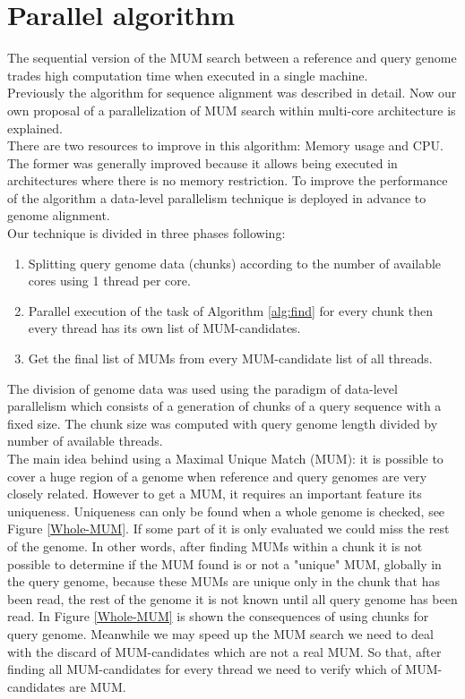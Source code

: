 \documentclass[3p,times]{elsarticle}
\begin{document}
\section{Parallel algorithm}  
The sequential version of the MUM search between a reference and query genome trades high computation time when executed in a single machine. \\
Previously the algorithm for sequence alignment was described in detail. Now our own proposal of a parallelization of MUM search within multi-core architecture is explained.\\
There are two resources to improve in this algorithm: Memory usage and CPU. The former was generally improved because it allows being executed in architectures where there is no memory restriction. To improve the performance of the algorithm a data-level parallelism technique is deployed in advance to genome alignment.\\
Our technique is divided in three phases following:
\begin{enumerate}
\item Splitting query genome data (chunks) according to the number of available cores using 1 thread per core.
\item Parallel execution of the task of Algorithm \ref{alg:find} for every chunk then every thread has its own list of MUM-candidates.
\item Get the final list of MUMs from every MUM-candidate list of all threads.
\end{enumerate}
The division of genome data was used using the paradigm of data-level parallelism which consists of a generation of chunks of a query sequence with a fixed size. The chunk size was computed with query genome length divided by number of available threads.\\
The main idea behind using a Maximal Unique Match (MUM): it is possible to cover a huge region of a genome when reference and query genomes are very closely related. However 
to get a MUM, it requires an important feature its uniqueness. Uniqueness can only be found when a whole genome is checked, see Figure \ref{Whole-MUM}. If some part of it is only evaluated we could miss the rest of the genome. In other words, after finding MUMs within a chunk it is not possible to determine if the MUM found is or not a "unique" MUM, globally in the query genome,  because these MUMs are unique only in the chunk that has been read, the rest of the genome it is not known until all query genome has been read. In Figure \ref{Whole-MUM} is shown the consequences of using chunks for query genome. Meanwhile we may speed up the MUM search we need to deal with the discard of MUM-candidates which are not a real MUM. So that, after finding all MUM-candidates for every thread we need to verify which of MUM-candidates are MUM.\\
\end{document}
